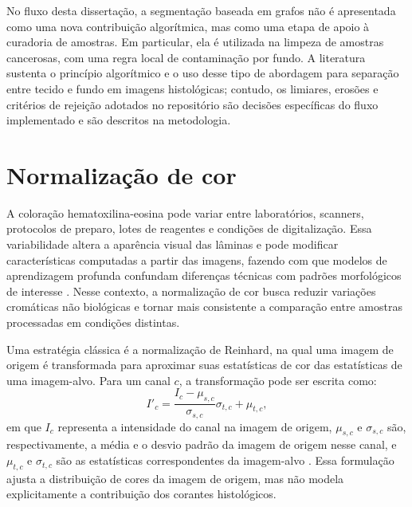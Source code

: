 No fluxo desta dissertação, a segmentação baseada em grafos não é apresentada
como uma nova contribuição algorítmica, mas como uma etapa de apoio à curadoria
de amostras. Em particular, ela é utilizada na limpeza de amostras cancerosas,
com uma regra local de contaminação por fundo. A literatura sustenta o princípio
algorítmico e o uso desse tipo de abordagem para separação entre tecido e fundo
em imagens histológicas; contudo, os limiares, erosões e critérios de rejeição
adotados no repositório são decisões específicas do fluxo implementado e são
descritos na metodologia.

\section{Normalização de cor}\label{sec:normalizacao_cor}

A coloração hematoxilina-eosina pode variar entre laboratórios, scanners,
protocolos de preparo, lotes de reagentes e condições de digitalização. Essa
variabilidade altera a aparência visual das lâminas e pode modificar
características computadas a partir das imagens, fazendo com que modelos de
aprendizagem profunda confundam diferenças técnicas com padrões morfológicos de
interesse \cite{tellez2019augmentation,duenweg2023scanner}. Nesse contexto, a
normalização de cor busca reduzir variações cromáticas não biológicas e tornar
mais consistente a comparação entre amostras processadas em condições distintas.

Uma estratégia clássica é a normalização de Reinhard, na qual uma imagem de
origem é transformada para aproximar suas estatísticas de cor das estatísticas
de uma imagem-alvo. Para um canal $c$, a transformação pode ser escrita como:
\begin{equation}\label{eq:reinhard-norm}
    I'_c = \frac{I_c-\mu_{s,c}}{\sigma_{s,c}}\sigma_{t,c}+\mu_{t,c},
\end{equation}
em que $I_c$ representa a intensidade do canal na imagem de origem,
$\mu_{s,c}$ e $\sigma_{s,c}$ são, respectivamente, a média e o desvio padrão da
imagem de origem nesse canal, e $\mu_{t,c}$ e $\sigma_{t,c}$ são as estatísticas
correspondentes da imagem-alvo \cite{reinhard2001color}. Essa formulação ajusta
a distribuição de cores da imagem de origem, mas não modela explicitamente a
contribuição dos corantes histológicos.


